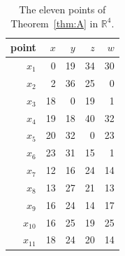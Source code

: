 \begin{table}[tb]
\caption{The eleven points of Theorem~\ref{thm:A} in $\mathbb{R}^4$.}\label{tab:coordsA}
\begin{ruledtabular}
\begin{tabular}{rrrrr}
point & $x$ & $y$ & $z$ & $w$ \\ \hline
$x_{1}$ & 0 & 19 & 34 & 30 \\
$x_{2}$ & 2 & 36 & 25 & 0 \\
$x_{3}$ & 18 & 0 & 19 & 1 \\
$x_{4}$ & 19 & 18 & 40 & 32 \\
$x_{5}$ & 20 & 32 & 0 & 23 \\
$x_{6}$ & 23 & 31 & 15 & 1 \\
$x_{7}$ & 12 & 16 & 24 & 14 \\
$x_{8}$ & 13 & 27 & 21 & 13 \\
$x_{9}$ & 16 & 24 & 14 & 17 \\
$x_{10}$ & 16 & 25 & 19 & 25 \\
$x_{11}$ & 18 & 24 & 20 & 14 \\
\end{tabular}
\end{ruledtabular}
\end{table}
